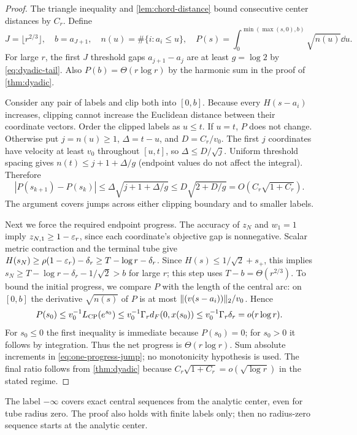\begin{proof}
The triangle inequality and \cref{lem:chord-distance} bound consecutive
center distances by $C_r$. Define
\[
 J=\lfloor r^{2/3}\rfloor,\quad b=a_{J+1},\quad
 n(u)=\#\{i:a_i\leq u\},\quad
 P(s)=\int_0^{\min(\max(s,0),b)}\sqrt{n(u)}\dd u.
\]
For large $r$, the first $J$ threshold gaps $a_{j+1}-a_j$
are at least $g=\log2$ by
\eqref{eq:dyadic-tail}. Also $P(b)=\Theta(r\log r)$ by the harmonic
sum in the proof of \cref{thm:dyadic}.

Consider any pair of labels and clip both into $[0,b]$. Because every
$H(s-a_i)$ increases, clipping cannot increase the Euclidean distance
between their coordinate vectors. Order the clipped labels as $u\leq t$.
If $u=t$, $P$ does not change. Otherwise put $j=n(u)\geq1$,
$\Delta=t-u$, and $D=C_r/v_0$. The first $j$ coordinates have velocity
at least $v_0$ throughout $[u,t]$, so $\Delta\leq D/\sqrt j$.
Uniform threshold spacing gives $n(t)\leq j+1+\Delta/g$ (endpoint
values do not affect the integral). Therefore
\begin{equation}
 |P(s_{k+1})-P(s_k)|
 \leq\Delta\sqrt{j+1+\Delta/g}
 \leq D\sqrt{2+D/g}=O(C_r\sqrt{1+C_r}).
 \label{eq:one-progress-jump}
\end{equation}
The argument covers jumps across either clipping boundary and to
smaller labels.

Next we force the required endpoint progress. The
accuracy of $z_N$ and $w_1=1$ imply $z_{N,1}\geq1-\varepsilon_r$, since each coordinate's objective
gap is nonnegative. Scalar metric contraction and the terminal tube give
$H(s_N)\geq\rho(1-\varepsilon_r)-\delta_r\geq T-\log r-\delta_r$.
Since $H(s)\leq1/\sqrt2+s_+$, this implies
$s_N\geq T-\log r-\delta_r-1/\sqrt2>b$ for large $r$;
this step uses $T-b=\Theta(r^{2/3})$.
To bound the initial progress, we compare $P$ with the length of the
central arc: on $[0,b]$ the derivative $\sqrt{n(s)}$ of $P$ is at
most $\lVert (v(s-a_i))\rVert_2/v_0$. Hence
\[
 P(s_0)\leq v_0^{-1}L_{\mathrm{CP}}(e^{s_0})
 \leq v_0^{-1}\Gamma_r d_F(0,x(s_0))
 \leq v_0^{-1}\Gamma_r\delta_r=o(r\log r).
\]
For $s_0\leq0$ the first inequality is immediate because $P(s_0)=0$;
for $s_0>0$ it follows by integration. Thus the net progress is
$\Theta(r\log r)$. Sum absolute increments in
\eqref{eq:one-progress-jump}; no monotonicity hypothesis is used.
The final ratio follows from \cref{thm:dyadic} because
$C_r\sqrt{1+C_r}=o(\sqrt{\log r})$ in the stated regime.
\end{proof}
The label $-\infty$ covers exact central sequences from the analytic
center, even for tube radius zero. The proof also holds with finite
labels only; then no radius-zero sequence starts at the analytic center.

